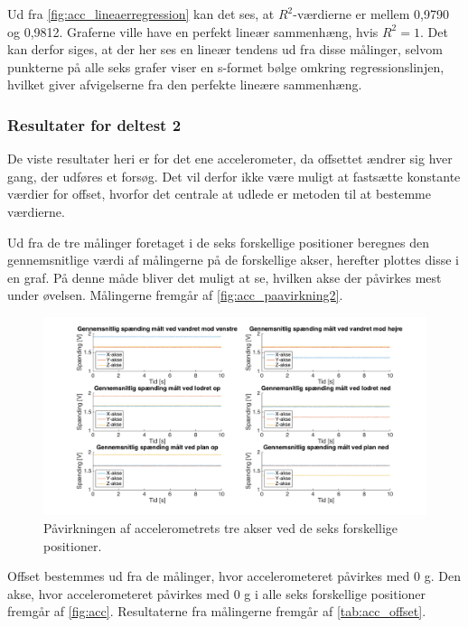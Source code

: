 Ud fra \autoref{fig:acc_lineaerregression} kan det ses, at $R^2$-værdierne er mellem 0,9790 og 0,9812. Graferne ville have en perfekt lineær sammenhæng, hvis $R^2=1$. Det kan derfor siges, at der her ses en lineær tendens ud fra disse målinger, selvom punkterne på alle seks grafer viser en s-formet bølge omkring regressionslinjen, hvilket giver afvigelserne fra den perfekte lineære sammenhæng.

\subsubsection{Resultater for deltest 2}
De viste resultater heri er for det ene accelerometer, da offsettet ændrer sig hver gang, der udføres et forsøg. Det vil derfor ikke være muligt at fastsætte konstante værdier for offset, hvorfor det centrale at udlede er metoden til at bestemme værdierne.

Ud fra de tre målinger foretaget i de seks forskellige positioner beregnes den gennemsnitlige værdi af målingerne på de forskellige akser, herefter plottes disse i en graf. På denne måde bliver det muligt at se, hvilken akse der påvirkes mest under øvelsen. Målingerne fremgår af \autoref{fig:acc_paavirkning2}. 

\begin{figure}[H]
\centering
\includegraphics[width=1.0\textwidth]{figures/paavirkning}
\caption{Påvirkningen af accelerometrets tre akser ved de seks forskellige positioner.}
\label{fig:acc_paavirkning2}
\end{figure}

Offset bestemmes ud fra de målinger, hvor accelerometeret påvirkes med 0 g. Den akse, hvor accelerometeret påvirkes med 0 g i alle seks forskellige positioner fremgår af \autoref{fig:acc}. Resultaterne fra målingerne fremgår af \autoref{tab:acc_offset}. 

